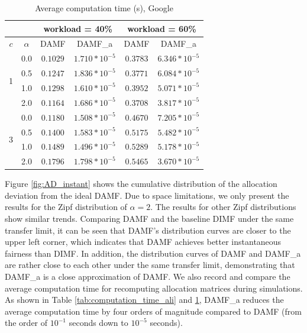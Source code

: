 \begin{table}[t]
  \caption{Average computation time (s), Google}
  \label{tab:computation_time_gg}
  \centering
    \begin{tabularx}{0.65\textwidth}{cccccc}
      \toprule
      & & \multicolumn{2}{c}{workload = 40\%} & \multicolumn{2}{c}{workload = 60\%}\\
      \midrule
      $c$ & $\alpha$ & DAMF & DAMF\_a & DAMF & DAMF\_a\\
      \midrule
      \multirow{4}{*}{1} 
      & 0.0 & $0.1029$ & $1.710*10^{-5}$ &$0.3783$ & $6.346*10^{-5}$ \\
      & 0.5 & $0.1247$ & $1.836*10^{-5}$ &$0.3771$ & $6.084*10^{-5}$ \\
      & 1.0 & $0.1298$ & $1.610*10^{-5}$&$0.3952$ & $5.071*10^{-5}$ \\
      & 2.0 & $0.1164$ & $1.686*10^{-5}$&$0.3708$ & $3.817*10^{-5}$ \\
      \midrule
      \multirow{4}{*}{3} 
      & 0.0 & $0.1180$ & $1.508*10^{-5}$&$0.4670$ & $7.205*10^{-5}$ \\
      & 0.5 & $0.1400$ & $1.583*10^{-5}$& $0.5175$ & $5.482*10^{-5}$ \\
      & 1.0 & $0.1489$ & $1.496*10^{-5}$& $0.5289$ & $5.178*10^{-5}$ \\
      & 2.0 &  $0.1796$ & $1.798*10^{-5}$ & $0.5465$ & $3.670*10^{-5}$ \\
      \bottomrule
    \end{tabularx}
\end{table}

Figure \ref{fig:AD_instant} shows the cumulative distribution of the allocation deviation from the ideal DAMF. Due to space limitations, we only present the results for the Zipf distribution of $\alpha = 2$. The results for other Zipf distributions show similar trends. Comparing DAMF and the baseline DIMF under the same transfer limit, it can be seen that DAMF's distribution curves are closer to the upper left corner, which indicates that DAMF achieves better instantaneous fairness than DIMF. In addition, the distribution curves of DAMF and DAMF\_a are rather close to each other under the same transfer limit, demonstrating that DAMF\_a is a close approximation of DAMF. We also record and compare the average computation time for recomputing allocation matrices during simulations. As shown in Table \ref{tab:computation_time_ali} and \ref{tab:computation_time_gg}, DAMF\_a reduces the average computation time by four orders of magnitude compared to DAMF (from the order of $10^{-1}$ seconds down to $10^{-5}$ seconds).

